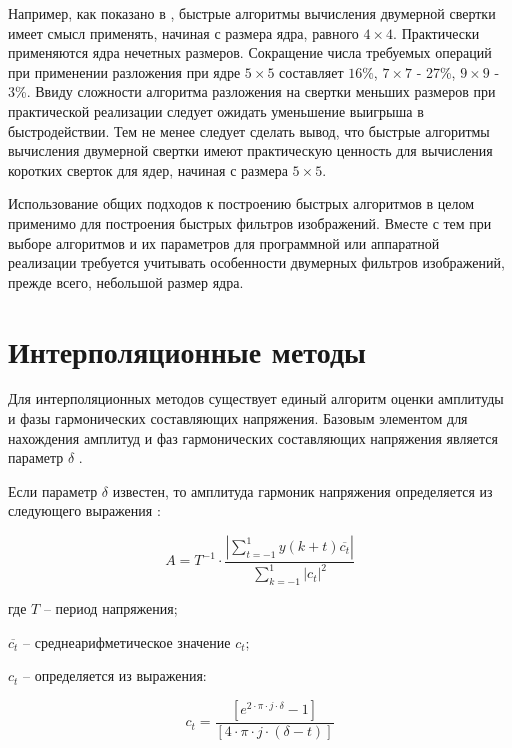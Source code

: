 Например, как показано в \cite{altman2015fast}, быстрые алгоритмы вычисления двумерной свертки
имеет смысл применять, начиная с размера ядра, равного $4\times4$. Практически применяются ядра нечетных размеров. Сокращение числа требуемых операций при применении разложения при ядре $5\times5$ составляет $16\%$, $7 \times 7 $ - 27\%, $9 \times 9$ - 3\%. Ввиду сложности
алгоритма разложения на свертки меньших размеров при практической реализации следует ожидать уменьшение выигрыша в быстродействии. Тем не менее следует сделать вывод, что быстрые алгоритмы вычисления двумерной свертки имеют практическую ценность для вычисления коротких сверток для ядер, начиная с размера $5\times5$.

Использование общих подходов к построению быстрых алгоритмов в целом применимо для построения быстрых фильтров изображений. Вместе с тем при выборе алгоритмов и их параметров для программной или аппаратной реализации требуется учитывать особенности двумерных фильтров изображений, прежде всего, небольшой размер ядра.

\section{Интерполяционные методы} \label{sec:ch3/sect2}
Для интерполяционных методов существует единый алгоритм оценки амплитуды и фазы гармонических составляющих напряжения. Базовым элементом для нахождения амплитуд и фаз гармонических составляющих напряжения является параметр $\delta$ \cite{558515}. 

Если параметр $\delta$ известен, то амплитуда гармоник напряжения определяется из следующего выражения \cite{558515}:

\begin{equation}
	\label{eq:equation3.11}
	A = T^{-1} \cdot \frac{\left|{\displaystyle\sum_{t=-1}^{1} y(k+t)\overline{c_t}} \right| }{\displaystyle\sum_{k=-1}^{1}|c_t|^2}
\end{equation}

где $T$ – период напряжения;

$\overline{c_t}$ – среднеарифметическое значение $c_t$;

$c_t$ – определяется из выражения:

\begin{equation}
	\label{eq:equation3.12}
	c_t = \frac{[e^{2 \cdot \pi \cdot j \cdot \delta} - 1]}{[4 \cdot \pi \cdot j \cdot (\delta - t)]}
\end{equation}

